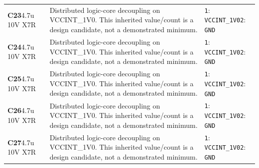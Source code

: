 \documentclass[11pt,a4paper]{article}
\begin{document}
\begin{longtable}{@{}P{27mm}P{84mm}P{57mm}@{}}
\textbf{C23}\newline 4.7u 10V X7R & Distributed logic-core decoupling on VCCINT\_1V0. This inherited value/count is a design candidate, not a demonstrated minimum. & \nolinkurl{1}: \nolinkurl{VCCINT_1V0}\newline \nolinkurl{2}: \nolinkurl{GND} \\
\textbf{C24}\newline 4.7u 10V X7R & Distributed logic-core decoupling on VCCINT\_1V0. This inherited value/count is a design candidate, not a demonstrated minimum. & \nolinkurl{1}: \nolinkurl{VCCINT_1V0}\newline \nolinkurl{2}: \nolinkurl{GND} \\
\textbf{C25}\newline 4.7u 10V X7R & Distributed logic-core decoupling on VCCINT\_1V0. This inherited value/count is a design candidate, not a demonstrated minimum. & \nolinkurl{1}: \nolinkurl{VCCINT_1V0}\newline \nolinkurl{2}: \nolinkurl{GND} \\
\textbf{C26}\newline 4.7u 10V X7R & Distributed logic-core decoupling on VCCINT\_1V0. This inherited value/count is a design candidate, not a demonstrated minimum. & \nolinkurl{1}: \nolinkurl{VCCINT_1V0}\newline \nolinkurl{2}: \nolinkurl{GND} \\
\textbf{C27}\newline 4.7u 10V X7R & Distributed logic-core decoupling on VCCINT\_1V0. This inherited value/count is a design candidate, not a demonstrated minimum. & \nolinkurl{1}: \nolinkurl{VCCINT_1V0}\newline \nolinkurl{2}: \nolinkurl{GND} \\

\end{longtable}
\end{document}
